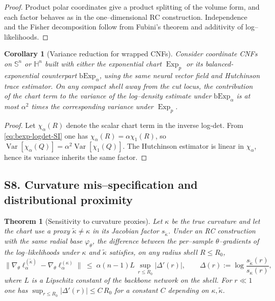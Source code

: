 \documentclass{article}
\newtheorem{theorem}{Theorem}
\newtheorem{corollary}{Corollary}
\theoremstyle{definition}
\theoremstyle{remark}
\newcommand{\SSS}{\mathbb{S}}
\newcommand{\HH}{\mathbb{H}}
\newcommand{\Exp}{\operatorname{Exp}}
\begin{document}
\begin{proof}
Product polar coordinates give a product splitting of the volume form, and each factor behaves as
in the one--dimensional RC construction. Independence and the Fisher decomposition follow from
Fubini's theorem and additivity of log--likelihoods.
\end{proof}

\begin{corollary}[Variance reduction for wrapped CNFs]
Consider coordinate CNFs on $\SSS^n$ or $\HH^n$ built with either the exponential chart
$\Exp_p$ or its balanced-exponential counterpart $\mathrm{bExp}_\alpha$, using the same neural
vector field and Hutchinson trace estimator. On any compact shell away from the cut locus, the
contribution of the chart term to the variance of the log--density estimate under
$\mathrm{bExp}_\alpha$ is at most $\alpha^2$ times the corresponding variance under $\Exp_p$.
\end{corollary}

\begin{proof}
Let $\chi_\alpha(R)$ denote the scalar chart term in the inverse log-det. From
\eqref{eq:bexp-logdet-SI} one has $\chi_\alpha(R)=\alpha\chi_1(R)$, so
$\operatorname{Var}[\chi_\alpha(Q)]=\alpha^2\operatorname{Var}[\chi_1(Q)]$. The Hutchinson estimator
is linear in $\chi_\alpha$, hence its variance inherits the same factor.
\end{proof}

\subsection*{S8. Curvature mis--specification and distributional proximity}

\begin{theorem}[Sensitivity to curvature proxies]\label{thm:sensitivity}
Let $\kappa$ be the true curvature and let the chart use a proxy $\tilde\kappa\neq\kappa$ in its
Jacobian factor $s_{\tilde\kappa}$. Under an RC construction with the same radial base
$\varphi_\theta$, the difference between the per--sample $\theta$--gradients of the log--likelihoods
under $\kappa$ and $\tilde\kappa$ satisfies, on any radius shell $R\le R_0$,
\[
\bigl\|\nabla_\theta \ell^{(\tilde\kappa)}_\alpha
-\nabla_\theta \ell^{(\kappa)}_\alpha\bigr\|
\;\le\;
\alpha(n-1)L\,\sup_{r\le R_0}\bigl|\Delta'(r)\bigr|,
\qquad
\Delta(r):=\log\frac{s_{\tilde\kappa}(r)}{s_\kappa(r)},
\]
where $L$ is a Lipschitz constant of the backbone network on the shell.
For $r\ll1$ one has $\sup_{r\le R_0}|\Delta'(r)|\le C\,R_0$ for a constant $C$ depending on
$\kappa,\tilde\kappa$.
\end{theorem}
\end{document}
